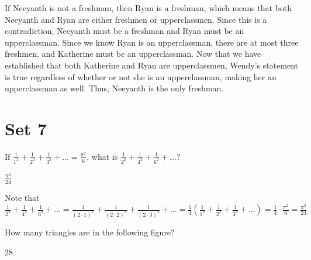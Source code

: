 \documentclass[11pt]{article}
\begin{document}
\begin{solution}
If Neeyanth is not a freshman, then Ryan is a freshman, which means that both Neeyanth and Ryan are either freshmen or upperclassmen. Since this is a contradiction, Neeyanth must be a freshman and Ryan must be an upperclassman. Since we know Ryan is an upperclassman, there are at most three freshmen, and Katherine must be an upperclassman. Now that we have established that both Katherine and Ryan are upperclassmen, Wendy's statement is true regardless of whether or not she is an upperclassman, making her an upperclassman as well. Thus, Neeyanth is the only freshman.
\end{solution}


\newpage
\section*{Set 7}
\begin{problem}
If $\frac{1}{1^2} + \frac{1}{2^2} + \frac{1}{3^2} + \dots = \frac{\pi^2}{6}$, what is $\frac{1}{2^2} + \frac{1}{4^2} + \frac{1}{6^2} + \ldots$?
\end{problem}

\begin{answer}
$\frac{\pi^2}{24}$
\end{answer}

\begin{solution}
Note that $\frac{1}{2^2} + \frac{1}{4^2} + \frac{1}{6^2} + \ldots = \frac{1}{(2 \cdot 1)^2} + \frac{1}{(2 \cdot 2)^2} + \frac{1}{(2 \cdot 3)^2} + \dots = \frac{1}{4}\left(\frac{1}{1^2} + \frac{1}{2^2} + \frac{1}{3^2} + \dots\right) = \frac{1}{4} \cdot \frac{\pi^2}{6} = \boxed{\frac{\pi^2}{24}}$
\end{solution}

\begin{problem}
How many triangles are in the following figure?
    
    \begin{center}
    \end{center}
    
\end{problem}

\begin{answer}
28
\end{answer}
\end{document}
